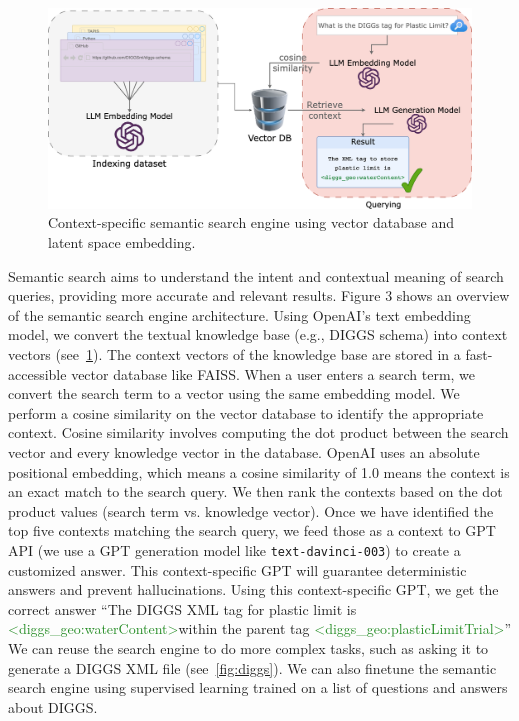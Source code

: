 \documentclass[12pt]{article}
\begin{document}
\begin{figure}[ht]
    \centering
    \includegraphics[width = 0.8\linewidth]{figs/semantic-search.png}
    \caption{Context-specific semantic search engine using vector database and latent space embedding.
    \label{fig:semantic-search}
}
\end{figure}
Semantic search aims to understand the intent and contextual meaning of search queries, providing more accurate and relevant results. Figure 3 shows an overview of the semantic search engine architecture. Using OpenAI's text embedding model, we convert the textual knowledge base (e.g., DIGGS schema) into context vectors (see~\cref{fig:semantic-search}). The context vectors of the knowledge base are stored in a fast-accessible vector database like FAISS. When a user enters a search term, we convert the search term to a vector using the same embedding model. We perform a cosine similarity on the vector database to identify the appropriate context. Cosine similarity involves computing the dot product between the search vector and every knowledge vector in the database. OpenAI uses an absolute positional embedding, which means a cosine similarity of 1.0 means the context is an exact match to the search query. We then rank the contexts based on the dot product values (search term vs. knowledge vector). Once we have identified the top five contexts matching the search query, we feed those as a context to GPT API (we use a GPT generation model like \verb|text-davinci-003|) to create a customized answer. This context-specific GPT will guarantee deterministic answers and prevent hallucinations. Using this context-specific GPT, we get the correct answer ``The DIGGS XML tag for plastic limit is \textcolor{ForestGreen}{\textless diggs\_geo:waterContent\textgreater}within the parent tag \textcolor{ForestGreen}{\textless diggs\_geo:plasticLimitTrial\textgreater}” We can reuse the search engine to do more complex tasks, such as asking it to generate a DIGGS XML file (see~\cref{fig:diggs}). We can also finetune the semantic search engine using supervised learning trained on a list of questions and answers about DIGGS. 
\end{document}
